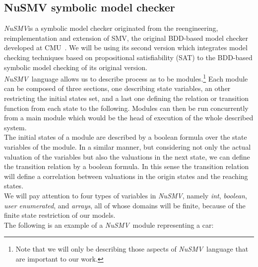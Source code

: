 \documentclass[12pt]{article}
\newcommand{\nusmv}{\mbox{\textit{NuSMV}}}
\begin{document}
\subsection{NuSMV symbolic model checker}\label{nusmv}
\nusmv is a symbolic model checker originated from the reengineering,
reimplementation and extension of SMV, the original BDD-based model checker
developed at CMU~\cite{cimatti}. We will be using its second version which
integrates model checking techniques based on propositional satisfiability
(SAT) to the BDD-based symbolic model checking of its original version.\\
\nusmv ~language allows us to describe process as to be modules.\footnote{Note
that we will only be describing those aspects of \nusmv ~language that are
important to our work.} Each module
can be composed of three sections, one describing state variables, an other
restricting the initial states set, and a last one defining the relation or
transition function from each state to the following. Modules can then be run
concurrently from a main module which would be the head of execution of the whole
described system.\\
The initial states of a module are described by a boolean formula over the
state variables of the module. In a similar manner, but considering not
only the actual valuation of the variables but also the valuations in
the next state, we can define the transition relation by a boolean formula.
In this sense the transition relation will define a correlation between
valuations in the origin states and the reaching states.\\
We will pay attention to four types of variables in \nusmv, namely \textit{int}, \textit{boolean}, \textit{user enumerated}, and \textit{arrays}, all of whose domains will be
finite, because of the finite state restriction of our models.\\
The following is an example of a \nusmv ~module representing a car:
\end{document}
